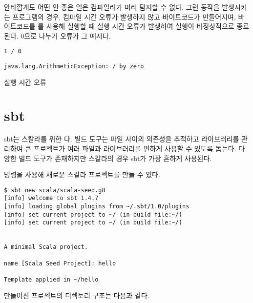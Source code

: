 안타깝게도 어떤 안 좋은 일은 컴파일러가 미리 탐지할 수 없다. 그런 동작을
발생시키는 프로그램의 경우, 컴파일 시간 오류가 발생하지 않고 바이트코드가
만들어지며, 바이트코드를 를 사용해 실행할 때 실행 시간 오류가 발생하여
실행이 비정상적으로 종료된다. 0으로 나누기 오류가 그 예시다.

\begin{verbatim}
1 / 0
\end{verbatim}
\vspace{-1em}
\begin{mdframed}[hidealllines=true,backgroundcolor=gray!10,innerleftmargin=3pt,innerrightmargin=3pt,leftmargin=-3pt,rightmargin=-3pt]
\begin{verbatim}
java.lang.ArithmeticException: / by zero
\end{verbatim}
\vspace{-2em}
\begin{flushright}
\scriptsize\textsf{실행 시간 오류}
\end{flushright}
\end{mdframed}

\section{sbt}

sbt는 스칼라를 위한 다. 빌드 도구는 파일 사이의 의존성을 추적하고
라이브러리를 관리하여 큰 프로젝트가 여러 파일과 라이브러리를 편하게 사용할 수 있도록
돕는다. 다양한 빌드 도구가 존재하지만 스칼라의 경우 sbt가 가장 흔하게 사용된다.

 명령을 사용해 새로운 스칼라 프로젝트를 만들 수 있다.

\begin{verbatim}
$ sbt new scala/scala-seed.g8
[info] welcome to sbt 1.4.7
[info] loading global plugins from ~/.sbt/1.0/plugins
[info] set current project to ~/ (in build file:~/)
[info] set current project to ~/ (in build file:~/)


A minimal Scala project.

name [Scala Seed Project]: hello

Template applied in ~/hello
\end{verbatim}

만들어진 프로젝트의 디렉토리 구조는 다음과 같다.


